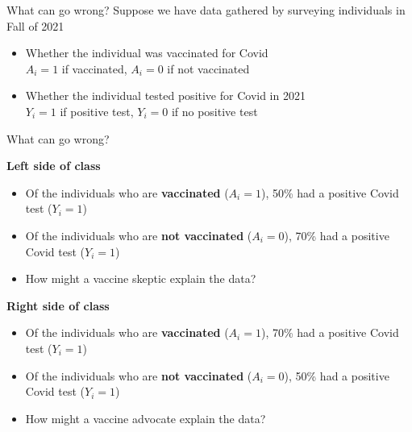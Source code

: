 \documentclass{beamer}
\begin{document}
\begin{frame}{What can go wrong?}
Suppose we have data gathered by surveying individuals in Fall of 2021
    \begin{itemize}
        \item Whether the individual was vaccinated for Covid\\
        $A_i = 1$ if vaccinated, $A_i = 0$ if not vaccinated
        \item Whether the individual tested positive for Covid in 2021\\
        $Y_i = 1$ if positive test, $Y_i = 0$ if no positive test
     \end{itemize}



\end{frame}



\begin{frame}{What can go wrong?}

{\large\textbf{Left side of class}} 
     \begin{itemize}
         \item Of the individuals who are \textbf{vaccinated} ($A_i = 1$), 50\% had a positive Covid test ($Y_i = 1$)
         \item Of the individuals who are \textbf{not vaccinated} ($A_i = 0$), 70\% had a positive Covid test ($Y_i = 1$) 
         \item How might a vaccine skeptic explain the data? 
\end{itemize}
\pause
\vspace{1em}
{\large\textbf{Right side of class}} 
     \begin{itemize}
         \item Of the individuals who are \textbf{vaccinated} ($A_i = 1$), 70\% had a positive Covid test ($Y_i = 1$)
         \item Of the individuals who are \textbf{not vaccinated} ($A_i = 0$), 50\% had a positive Covid test ($Y_i = 1$) 
         \item How might a vaccine advocate explain the data? 
\end{itemize}






\end{frame}
\end{document}
